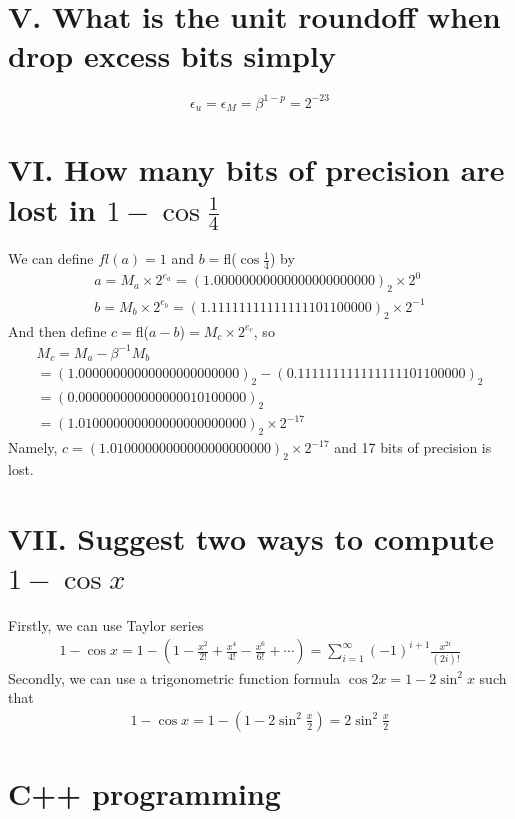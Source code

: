 \documentclass[twoside,a4paper]{article}
\begin{document}
\section*{V. What is the unit roundoff when drop excess bits simply}
\[
\epsilon_u=\epsilon_M=\beta^{1-p}=2^{-23}
\]
\section*{VI. How many bits of precision are lost in $1-\cos{\frac{1}{4}}$}
We can define $fl(a)=1$ and $b=$fl($\cos{\frac{1}{4}}$) by
\begin{gather}
a=M_a\times2^{e_a}=(1.00000000000000000000000)_2\times2^{0} \\
b=M_b\times2^{e_b}=(1.11111111111111101100000)_2\times2^{-1}
\end{gather}
And then define $c=$fl($a-b$)$=M_c\times2^{e_c}$, so 
\begin{gather}
M_c=M_a-\beta^{-1}M_b \\ 
=(1.00000000000000000000000)_2-(0.111111111111111101100000)_2 \\
=(0.000000000000000010100000)_2 \\
=(1.010000000000000000000000)_2\times2^{-17}
\end{gather}
Namely, $c=(1.01000000000000000000000)_2\times2^{-17}$ and 17 bits of precision is lost.

\section*{VII. Suggest two ways to compute $1-\cos{x}$}
Firstly, we can use Taylor series
\begin{gather}
1-\cos{x}=1-(1-\frac{x^2}{2!}+\frac{x^4}{4!}-\frac{x^6}{6!}+\cdots)=\sum_{i=1}^{\infty}(-1)^{i+1}\frac{x^{2i}}{(2i)!}
\end{gather}
Secondly, we can use a trigonometric function formula $\cos{2x}=1-2\sin^2{x}$ such that
\begin{gather}
1-\cos{x}=1-(1-2\sin^2{\frac{x}{2}})=2\sin^2{\frac{x}{2}}
\end{gather}

\section*{C++ programming}
\end{document}

